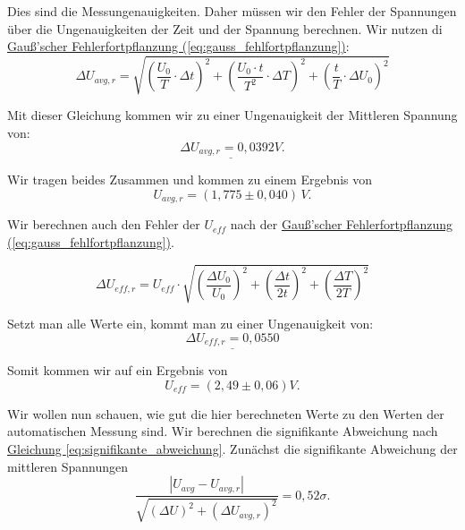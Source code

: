 Dies sind die Messungenauigkeiten. Daher müssen wir den Fehler der Spannungen über die Ungenauigkeiten der Zeit und der Spannung berechnen. Wir nutzen di \hyperref[eq:gauss_fehlfortpflanzung]{Gauß'scher Fehlerfortpflanzung (\ref*{eq:gauss_fehlfortpflanzung})}:
\begin{equation}
    \Delta U_{avg,r} = \sqrt{\left(\frac{U_0}{T} \cdot \Delta t\right)^2 + \left(\frac{U_0 \cdot t}{T^2} \cdot \Delta T\right)^2  + \left(\frac{t}{T} \cdot \Delta U_0\right)^2}
    \label{eq:f_avg}
\end{equation}

Mit dieser Gleichung kommen wir zu einer Ungenauigkeit der Mittleren Spannung von:
\begin{equation}
    \underline{
        \Delta U_{avg,r} = 0,0392 V
    }.
\end{equation}

Wir tragen beides Zusammen und kommen zu einem Ergebnis von
\begin{equation}
\boxed{
    U_{avg,r} = (1,775 \pm 0,040) \, V
}.
\end{equation}

Wir berechnen auch den Fehler der $U_{eff}$ nach der \hyperref[eq:gauss_fehlfortpflanzung]{Gauß'scher Fehlerfortpflanzung (\ref*{eq:gauss_fehlfortpflanzung})}.

\begin{equation}
    \Delta U_{eff,r} = U_{eff} \cdot \sqrt{\left(\frac{\Delta U_0}{U_0}\right)^2 + \left(\frac{\Delta t}{2t}\right)^2 + \left(\frac{\Delta T}{2T}\right)^2}
        \label{eq:f_eff}
\end{equation}

Setzt man alle Werte ein, kommt man zu einer Ungenauigkeit von:
\begin{equation}
    \underline{
        \Delta U_{eff,r} = 0,0550
    }
\end{equation}

Somit kommen wir auf ein Ergebnis von
\begin{equation}
    \boxed{
        U_{eff} = (2,49 \pm 0,06) V
    }.
\end{equation}

Wir wollen nun schauen, wie gut die hier berechneten Werte zu den Werten der automatischen Messung sind. Wir berechnen die signifikante Abweichung nach \hyperref[eq:signifikante_abweichung]{Gleichung \ref*{eq:signifikante_abweichung}}.
Zunächst die signifikante Abweichung der mittleren Spannungen
\begin{equation}
    \frac{\left| U_{avg} - U_{avg,r} \right|}{\sqrt{(\Delta U)^2 + (\Delta U_{avg,r})^2}} = 0,52\sigma.
\end{equation}

